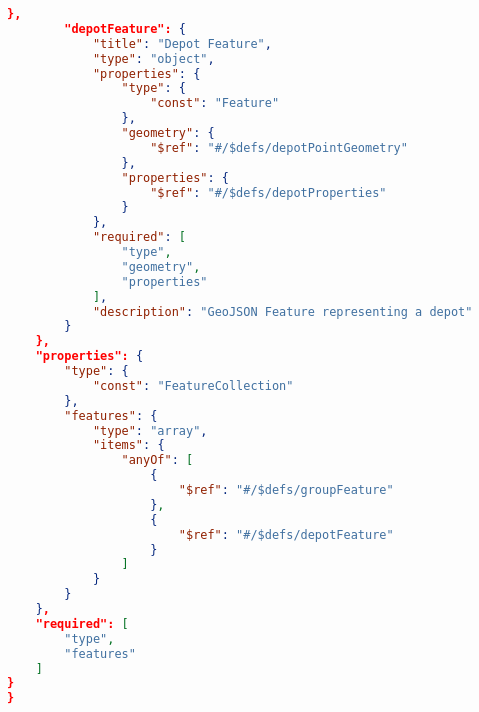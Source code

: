 \begin{lstlisting}[language=json, caption={Input GeoJSON Schema}, label={lst:jsonschema}]
        },
        "depotFeature": {
            "title": "Depot Feature",
            "type": "object",
            "properties": {
                "type": {
                    "const": "Feature"
                },
                "geometry": {
                    "$ref": "#/$defs/depotPointGeometry"
                },
                "properties": {
                    "$ref": "#/$defs/depotProperties"
                }
            },
            "required": [
                "type",
                "geometry",
                "properties"
            ],
            "description": "GeoJSON Feature representing a depot"
        }
    },
    "properties": {
        "type": {
            "const": "FeatureCollection"
        },
        "features": {
            "type": "array",
            "items": {
                "anyOf": [
                    {
                        "$ref": "#/$defs/groupFeature"
                    },
                    {
                        "$ref": "#/$defs/depotFeature"
                    }
                ]
            }
        }
    },
    "required": [
        "type",
        "features"
    ]
}
}
\end{lstlisting}